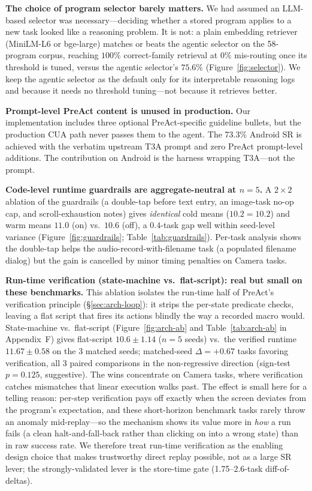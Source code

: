 \documentclass[11pt]{article}
\begin{document}
\textbf{The choice of program selector barely matters.} We had assumed an LLM-based selector was necessary---deciding whether a stored program applies to a new task looked like a reasoning problem. It is not: a plain embedding retriever (MiniLM-L6 or bge-large) matches or beats the agentic selector on the 58-program corpus, reaching $100\%$ correct-family retrieval at $0\%$ mis-routing once its threshold is tuned, versus the agentic selector's $75.6\%$ (Figure~\ref{fig:selector}). We keep the agentic selector as the default only for its interpretable reasoning logs and because it needs no threshold tuning---not because it retrieves better.

\textbf{Prompt-level PreAct content is unused in production.} Our implementation includes three optional PreAct-specific guideline bullets, but the production CUA path never passes them to the agent. The 73.3\% Android SR is achieved with the verbatim upstream T3A prompt and zero PreAct prompt-level additions. The contribution on Android is the harness wrapping T3A---not the prompt.

\textbf{Code-level runtime guardrails are aggregate-neutral at $n{=}5$.} A $2{\times}2$ ablation of the guardrails (a double-tap before text entry, an image-task no-op cap, and scroll-exhaustion notes) gives \emph{identical} cold means ($10.2 = 10.2$) and warm means $11.0$ (on) vs.\ $10.6$ (off), a $0.4$-task gap well within seed-level variance (Figure~\ref{fig:guardrails}; Table~\ref{tab:guardrails}). Per-task analysis shows the double-tap helps the audio-record-with-filename task (a populated filename dialog) but the gain is cancelled by minor timing penalties on Camera tasks.

\textbf{Run-time verification (state-machine vs.\ flat-script): real but small on these benchmarks.} This ablation isolates the run-time half of PreAct's verification principle (\S\ref{sec:arch-loop}): it strips the per-state predicate checks, leaving a flat script that fires its actions blindly the way a recorded macro would. State-machine vs.\ flat-script (Figure~\ref{fig:arch-ab} and Table~\ref{tab:arch-ab} in Appendix~F) gives flat-script $10.6 \pm 1.14$ ($n{=}5$ seeds) vs.\ the verified runtime $11.67 \pm 0.58$ on the 3 matched seeds; matched-seed $\Delta = +0.67$ tasks favoring verification, all 3 paired comparisons in the non-regressive direction (sign-test $p = 0.125$, suggestive). The wins concentrate on Camera tasks, where verification catches mismatches that linear execution walks past. The effect is small here for a telling reason: per-step verification pays off exactly when the screen deviates from the program's expectation, and these short-horizon benchmark tasks rarely throw an anomaly mid-replay---so the mechanism shows its value more in \emph{how} a run fails (a clean halt-and-fall-back rather than clicking on into a wrong state) than in raw success rate. We therefore treat run-time verification as the enabling design choice that makes trustworthy direct replay possible, not as a large SR lever; the strongly-validated lever is the store-time gate (1.75--2.6-task diff-of-deltas).
\end{document}
